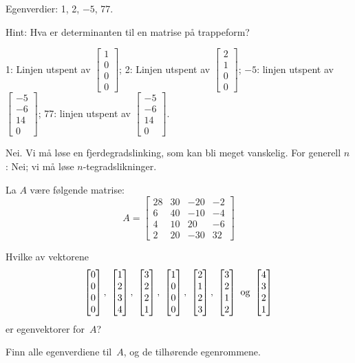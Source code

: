 \begin{losning}

\begin{punkt}
Egenverdier: 1, 2, $-5$, 77. 

\noindent
Hint: Hva er determinanten til en matrise på trappeform?
\end{punkt}

\begin{punkt}

1: Linjen utspent av $\begin{bmatrix}
1\\
0\\
0\\
0
\end{bmatrix}$; 2: Linjen utspent av $\begin{bmatrix}
2\\
1\\
0\\
0
\end{bmatrix}$; $-5$: linjen utspent av $\begin{bmatrix}
-5\\
-6\\
14\\
0
\end{bmatrix}$; 77: linjen utspent av $\begin{bmatrix}
-5\\
-6\\
14\\
0
\end{bmatrix}$.

\end{punkt}

\begin{punkt}
Nei. Vi må løse en fjerdegradslinking, som kan bli meget vanskelig. For generell $n$: Nei; vi må løse $n$-tegradslikninger.
\end{punkt}

\end{losning}


\begin{oppgave}
La $A$ være følgende matrise:
\[
A =
\begin{bmatrix}
 28 & 30 & -20 & -2 \\
 6 & 40 & -10 & -4 \\
 4 & 10 & 20 & -6 \\
 2 & 20 & -30 & 32
\end{bmatrix}
\]
\begin{punkt}
Hvilke av vektorene
\[
\vvvv{0}{0}{0}{0},\ %
\vvvv{1}{2}{3}{4},\ %
\vvvv{3}{2}{2}{1},\ %
\vvvv{1}{0}{0}{0},\ %
\vvvv{2}{1}{2}{3},\ %
\vvvv{3}{2}{1}{2}\ \text{og}\ %
\vvvv{4}{3}{2}{1}
\]
er egenvektorer for~$A$?
\end{punkt}
\begin{punkt}
Finn alle egenverdiene til~$A$, og de tilhørende egenrommene.
\end{punkt}
\end{oppgave}

